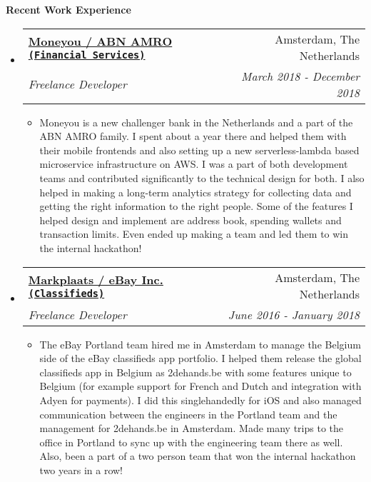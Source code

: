 \documentclass[letterpaper,11pt]{article}
\makeatletter
\newcommand{\resitem}[1]{\item #1 \vspace{-2pt}}
\newcommand{\resheading}[1]{{\large \colorbox{mygrey}{\begin{minipage}{\textwidth}{\textbf{#1 \vphantom{p\^{E}}}}\end{minipage}}}}
\newcommand{\ressubheading}[4]{
\begin{tabular*}{7.0in}{l@{\extracolsep{\fill}}r}
    \textbf{#1} & #2 \\
    \textit{#3} & \textit{#4} \\
\end{tabular*}\vspace{-6pt}}
\makeatother
\begin{document}
\resheading{Recent Work Experience}
\begin{itemize}

\item
    \ressubheading{\href{https://www.moneyou.nl/}{Moneyou / ABN AMRO \texttt{(Financial Services)}}}{Amsterdam, The Netherlands}{Freelance Developer}{March 2018 - December 2018}
    \begin{itemize}
        \vspace{0.05in}
        \resitem{ Moneyou is a new challenger bank in the Netherlands and a part of the ABN AMRO family. I spent about a year there and helped them with their mobile frontends and also setting up a new serverless-lambda based microservice infrastructure on AWS. I was a part of both development teams  and contributed significantly to the technical design for both. I also helped in making a long-term analytics strategy for collecting data and getting the right information to the right people.  Some of the features I helped design and implement are address book, spending wallets and transaction limits. Even ended up making a team and led them to win the internal hackathon! }
    \end{itemize}

\vspace{0.in}

\item
    \ressubheading{\href{https://www.ebay.com/}{Markplaats / eBay Inc. \texttt{(Classifieds)}}}{Amsterdam, The Netherlands}{Freelance Developer}{June 2016 - January 2018}
    \begin{itemize}
        \vspace{0.05in}
        \resitem{ The eBay Portland team hired me in Amsterdam to manage the Belgium side of the eBay classifieds app portfolio. I helped them release the global classifieds app in Belgium as 2dehands.be with some features unique to Belgium (for example support for French and Dutch and integration with Adyen for payments). I did this singlehandedly for iOS and also managed communication between the engineers in the Portland team and the management for 2dehands.be in Amsterdam. Made many trips to the office in Portland to sync up with the engineering team there as well.  Also, been a part of a two person team that won the internal hackathon two years in a row! }
    \end{itemize}
    
\vspace{0.in}


\end{itemize}
\end{document}
